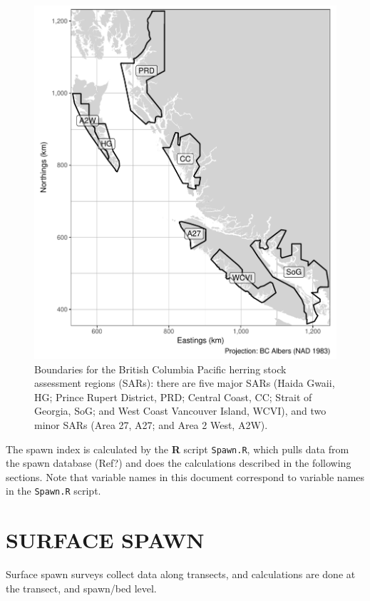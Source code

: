 \documentclass[12pt]{article}
\begin{document}
\begin{figure}
\centering
\includegraphics[width=\linewidth]{Figures/BC.pdf}
\caption{Boundaries for the British Columbia Pacific herring stock assessment regions (SARs): there are five major SARs (Haida Gwaii, HG; Prince Rupert District, PRD; Central Coast, CC; Strait of Georgia, SoG; and West Coast Vancouver Island, WCVI), and two minor SARs (Area 27, A27; and Area 2 West, A2W).}
\label{figBC}
\end{figure}

The spawn index is calculated by the \textbf{R} \citeyearpar[RCT][]{R-3.3.2} script \texttt{Spawn.R}, which pulls data from the spawn database (Ref?) and does the calculations described in the following sections.
Note that variable names in this document correspond to variable names in the \texttt{Spawn.R} script.

\section{SURFACE SPAWN}

Surface spawn surveys collect data along transects, and calculations are done at the transect, and spawn/bed level.
\end{document}
